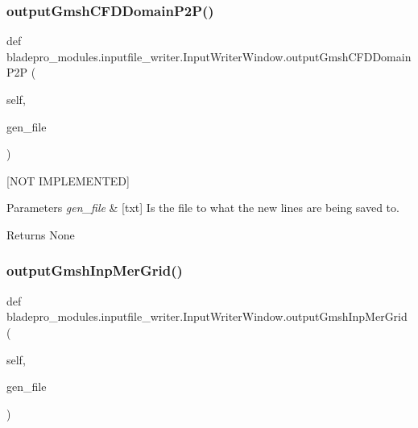 \subsubsection{\texorpdfstring{output\+Gmsh\+C\+F\+D\+Domain\+P2\+P()}{outputGmshCFDDomainP2P()}}
{\footnotesize\ttfamily def bladepro\+\_\+modules.\+inputfile\+\_\+writer.\+Input\+Writer\+Window.\+output\+Gmsh\+C\+F\+D\+Domain\+P2P (\begin{DoxyParamCaption}\item[{}]{self,  }\item[{}]{gen\+\_\+file }\end{DoxyParamCaption})}



\mbox{[}N\+OT I\+M\+P\+L\+E\+M\+E\+N\+T\+ED\mbox{]} 


\begin{DoxyParams}{Parameters}
{\em gen\+\_\+file} & \mbox{[}txt\mbox{]} Is the file to what the new lines are being saved to. \\
\hline
\end{DoxyParams}
\begin{DoxyReturn}{Returns}
None 
\end{DoxyReturn}
\hypertarget{classbladepro__modules_1_1inputfile__writer_1_1_input_writer_window_a258f943645c60945cbb97494db0ebf52}{}\label{classbladepro__modules_1_1inputfile__writer_1_1_input_writer_window_a258f943645c60945cbb97494db0ebf52} 
\subsubsection{\texorpdfstring{output\+Gmsh\+Inp\+Mer\+Grid()}{outputGmshInpMerGrid()}}
{\footnotesize\ttfamily def bladepro\+\_\+modules.\+inputfile\+\_\+writer.\+Input\+Writer\+Window.\+output\+Gmsh\+Inp\+Mer\+Grid (\begin{DoxyParamCaption}\item[{}]{self,  }\item[{}]{gen\+\_\+file }\end{DoxyParamCaption})}



